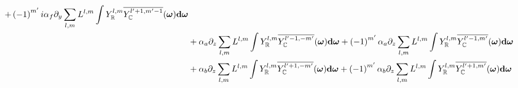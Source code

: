 \begin{align*}
+\left({-1}\right)^{m'}i \alpha_f\partial_y\sum_{l,m}L^{l,m}\int{Y_{\mathbb{R}}^{l,m}\overline{Y_{\mathbb{C}}^{l'+1, m'-1}}(\boldsymbol{\mathbf{\omega}} )\mathbf{d}\boldsymbol{\mathbf{\omega}}}
\\&
+\alpha_a\partial_z\sum_{l,m}L^{l,m}\int{Y_{\mathbb{R}}^{l,m}\overline{Y_{\mathbb{C}}^{l'-1, -m'}}(\boldsymbol{\mathbf{\omega}} )\mathbf{d}\boldsymbol{\mathbf{\omega}}}
+\left({-1}\right)^{m'}\alpha_a\partial_z\sum_{l,m}L^{l,m}\int{Y_{\mathbb{R}}^{l,m}\overline{Y_{\mathbb{C}}^{l'-1, m'}}(\boldsymbol{\mathbf{\omega}} )\mathbf{d}\boldsymbol{\mathbf{\omega}}}
\\&
+\alpha_b\partial_z\sum_{l,m}L^{l,m}\int{Y_{\mathbb{R}}^{l,m}\overline{Y_{\mathbb{C}}^{l'+1, -m'}}(\boldsymbol{\mathbf{\omega}} )\mathbf{d}\boldsymbol{\mathbf{\omega}}}
+\left({-1}\right)^{m'}\alpha_b\partial_z\sum_{l,m}L^{l,m}\int{Y_{\mathbb{R}}^{l,m}\overline{Y_{\mathbb{C}}^{l'+1, m'}}(\boldsymbol{\mathbf{\omega}} )\mathbf{d}\boldsymbol{\mathbf{\omega}}}
\end{align*}

